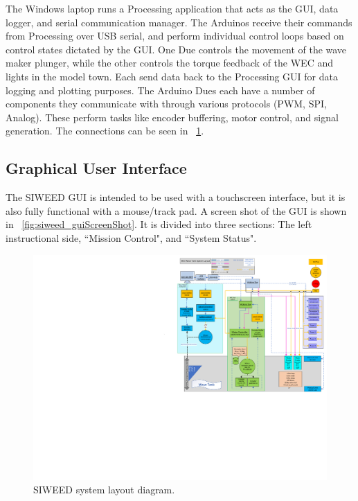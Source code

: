 \documentclass[hardware,article,submit,pdftex,moreauthors]{Definitions/mdpi}
\begin{document}
The Windows laptop runs a Processing application that acts as the GUI, data logger, and serial communication manager.
The Arduinos receive their commands from Processing over USB serial, and perform individual control loops based on control states dictated by the GUI.
One Due controls the movement of the wave maker plunger, while the other controls the torque feedback of the WEC and lights in the model town.
Each send data back to the Processing GUI for data logging and plotting purposes.
The Arduino Dues each have a number of components they communicate with through various protocols (PWM, SPI, Analog).
These perform tasks like encoder buffering, motor control, and signal generation.
The connections can be seen in \figurename~\ref{fig:siweed_layout}.

\subsection{Graphical User Interface}
The SIWEED GUI is intended to be used with a touchscreen interface, but it is also fully functional with a mouse/track pad.
A screen shot of the GUI is shown in \figurename~\ref{fig:siweed_guiScreenShot}.
It is divided into three sections: The left instructional side, ``Mission Control", and ``System Status".

\begin{figure}[tb]
  \centering
  \includegraphics[width=1\textwidth]{diagrams/SystemLayout.pdf}
  \caption{SIWEED system layout diagram.}
  \label{fig:siweed_layout}
\end{figure}
\end{document}
